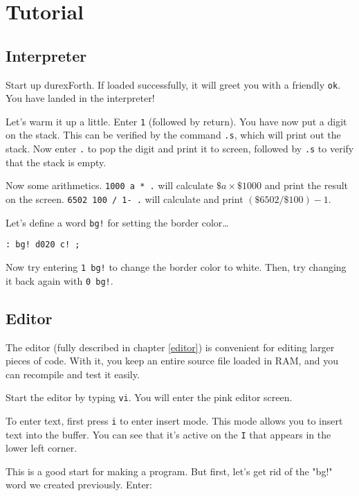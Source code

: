 \chapter{Tutorial}

\section{Interpreter}

Start up durexForth. If loaded successfully, it will greet you with a friendly \texttt{ok}. You have landed in the interpreter!

Let's warm it up a little. Enter \texttt{1} (followed by return). You have now put a digit on the stack. This can be verified by the command \texttt{.s}, which will print out the stack. Now enter \texttt{.} to pop the digit and print it to screen, followed by \texttt{.s} to verify that the stack is empty.

Now some arithmetics. \texttt{1000 a * .} will calculate $\$a \times \$1000$ and print the result on the screen. \texttt{6502 100 / 1- .} will calculate and print $(\$6502 / \$100) - 1$.

Let's define a word \texttt{bg!} for setting the border color\ldots 

\begin{verbatim}
: bg! d020 c! ;
\end{verbatim}

Now try entering \texttt{1 bg!} to change the border color to white.
Then, try changing it back again with \texttt{0 bg!}.

\section{Editor}

The editor (fully described in chapter \ref{editor}) is convenient for editing larger pieces of code. With it, you keep an entire source file loaded in RAM, and you can recompile and test it easily.

Start the editor by typing \texttt{vi}. You will enter the pink editor screen.

To enter text, first press \texttt{i} to enter insert mode. This mode allows you to insert text into the buffer. You can see that it's active on the \texttt{I} that appears in the lower left corner.

This is a good start for making a program. 
But first, let's get rid of the "bg!" word we created previously. Enter:

